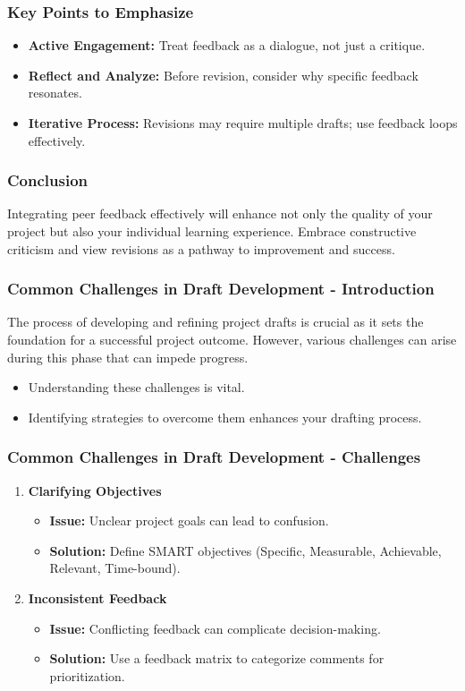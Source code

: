 \documentclass[aspectratio=169]{beamer}
\begin{document}
\begin{frame}[fragile]
    \frametitle{Key Points to Emphasize}
    \begin{itemize}
        \item \textbf{Active Engagement:} Treat feedback as a dialogue, not just a critique.
        \item \textbf{Reflect and Analyze:} Before revision, consider why specific feedback resonates.
        \item \textbf{Iterative Process:} Revisions may require multiple drafts; use feedback loops effectively.
    \end{itemize}
\end{frame}

\begin{frame}[fragile]
    \frametitle{Conclusion}
    Integrating peer feedback effectively will enhance not only the quality of your project but also your individual learning experience. Embrace constructive criticism and view revisions as a pathway to improvement and success.
\end{frame}

\begin{frame}[fragile]
    \frametitle{Common Challenges in Draft Development - Introduction}
    The process of developing and refining project drafts is crucial as it sets the foundation for a successful project outcome. However, various challenges can arise during this phase that can impede progress. 

    \begin{itemize}
        \item Understanding these challenges is vital.
        \item Identifying strategies to overcome them enhances your drafting process.
    \end{itemize}
\end{frame}

\begin{frame}[fragile]
    \frametitle{Common Challenges in Draft Development - Challenges}
    \begin{enumerate}
        \item \textbf{Clarifying Objectives}
            \begin{itemize}
                \item \textbf{Issue:} Unclear project goals can lead to confusion.
                \item \textbf{Solution:} Define SMART objectives (Specific, Measurable, Achievable, Relevant, Time-bound).
            \end{itemize}
            
        \item \textbf{Inconsistent Feedback}
            \begin{itemize}
                \item \textbf{Issue:} Conflicting feedback can complicate decision-making.
                \item \textbf{Solution:} Use a feedback matrix to categorize comments for prioritization.
            \end{itemize}
    \end{enumerate}
\end{frame}
\end{document}
